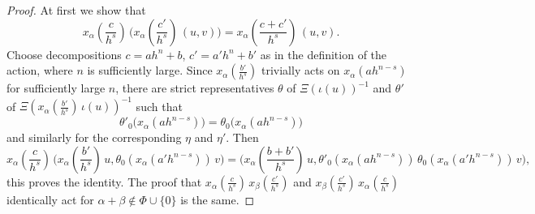 \documentclass[oneside, 11pt]{amsart} \pdfoutput=1
\begin{document}
\begin{proof}
At first we show that 
$$\textstyle
x_\alpha(\frac c {h^s})\, \bigl(x_\alpha(\frac{c'}{h^s})\, (u, v)\bigr) = x_\alpha(\frac{c+c'}{h^s})\, (u, v).
$$
Choose decompositions $c = ah^n + b$, $c' = a'h^n + b'$ as in the definition of the action, where \(n\) is sufficiently large. Since $x_\alpha(\frac{b'}{h^s})$ trivially acts on $x_\alpha(ah^{n-s})$ for sufficiently large $n$, there are strict representatives $\theta$ of $\Xi(\iota(u))^{-1}$ and $\theta'$ of $\Xi(x_\alpha(\frac{b'}{h^s})\, \iota(u))^{-1}$ such that
$$
\theta'_0\bigl(x_\alpha(ah^{n-s})\bigr) = \theta_0\bigl(x_\alpha(ah^{n-s})\bigr)
$$
and similarly for the corresponding $\eta$ and $\eta'$. Then
$$\textstyle
x_\alpha(\frac c {h^s})\, \bigl(x_\alpha(\frac{b'}{h^s})\, u, \theta_0(x_\alpha(a' h^{n-s}))\, v\bigr) = \bigl(x_\alpha(\frac{b + b'}{h^s})\, u, \theta'_0(x_\alpha(a h^{n - s}))\, \theta_0(x_\alpha(a' h^{n - s}))\, v\bigr),
$$
this proves the identity. The proof that $x_\alpha(\frac c {h^s})\, x_\beta(\frac{c'}{h^s})$ and $x_\beta(\frac{c'}{h^s})\, x_\alpha(\frac c {h^s})$ identically act for $\alpha + \beta \notin \Phi \cup \{0\}$ is the same.


\end{proof}
\end{document}
